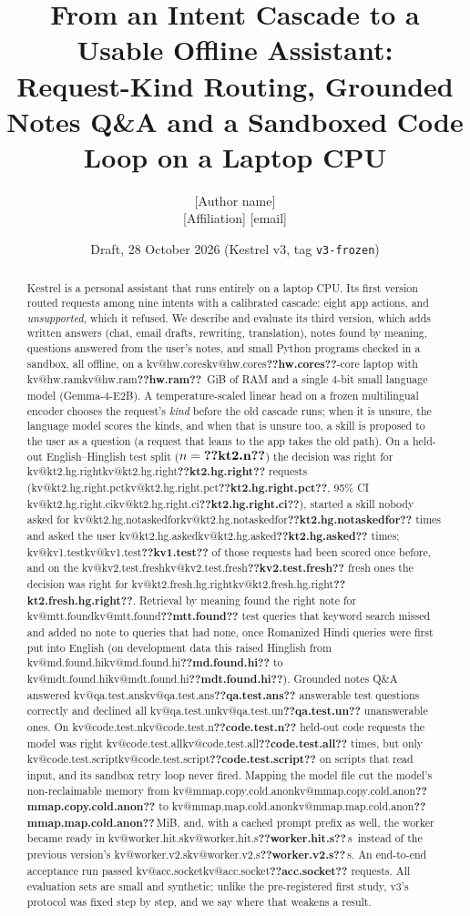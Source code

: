 \documentclass[11pt,a4paper]{article}
\title{From an Intent Cascade to a Usable Offline Assistant:\\
Request-Kind Routing, Grounded Notes Q\&A and a Sandboxed Code Loop on a Laptop CPU}
\author{[Author name]\\[2pt] \small [Affiliation] \quad \small [email]}
\date{Draft, 28 October 2026 (Kestrel v3, tag \texttt{v3-frozen})}
\makeatletter
\DeclareRobustCommand{\kv}[1]{\ifcsname kv@#1\endcsname\csname kv@#1\endcsname\else\textbf{??#1??}\fi}
\newcommand{\s}{\,s}
\newcommand{\MiB}{\,MiB}
\makeatother
\begin{document}
\maketitle

\begin{abstract}
Kestrel is a personal assistant that runs entirely on a laptop CPU. Its first version routed requests among nine
intents with a calibrated cascade: eight app actions, and \emph{unsupported}, which it refused. We describe and evaluate its third version, which
adds written answers (chat, email drafts, rewriting, translation), notes found by meaning, questions answered from
the user's notes, and small Python programs checked in a sandbox, all offline, on a \kv{hw.cores}-core laptop with
\kv{hw.ram}~GiB of RAM and a single 4-bit small language model (Gemma-4-E2B). A temperature-scaled linear head on a
frozen multilingual encoder chooses the request's \emph{kind} before the old cascade runs; when it is unsure, the
language model scores the kinds, and when that is unsure too, a skill is proposed to the user as a question (a request
that leans to the app takes the old path). On a held-out English--Hinglish test
split ($n=\kv{kt2.n}$) the decision was right for \kv{kt2.hg.right} requests (\kv{kt2.hg.right.pct}, 95\% CI
\kv{kt2.hg.right.ci}), started a skill nobody asked for \kv{kt2.hg.notaskedfor} times and asked the user
\kv{kt2.hg.asked} times; \kv{kv1.test} of those requests had been scored once before, and on the \kv{kv2.test.fresh}
fresh ones the decision was right for \kv{kt2.fresh.hg.right}. Retrieval by meaning found the right note for
\kv{mtt.found} test queries that keyword search missed and added no note to queries that had none, once Romanized
Hindi queries were first put into English (on development data this raised Hinglish from \kv{md.found.hi} to
\kv{mdt.found.hi}). Grounded notes Q\&A answered \kv{qa.test.ans} answerable test questions correctly and declined all
\kv{qa.test.un} unanswerable ones. On \kv{code.test.n} held-out code requests the model was right \kv{code.test.all}
times, but only \kv{code.test.script} on scripts that read input, and its sandbox retry loop never fired. Mapping the
model file cut the model's non-reclaimable memory from \kv{mmap.copy.cold.anon} to \kv{mmap.map.cold.anon}\MiB, and,
with a cached prompt prefix as well, the worker became ready in \kv{worker.hit.s}\s\ instead of the previous version's
\kv{worker.v2.s}\s. An end-to-end acceptance run passed
\kv{acc.socket} requests. All evaluation sets are small and synthetic; unlike the pre-registered first study, v3's
protocol was fixed step by step, and we say where that weakens a result.
\end{abstract}
\end{document}
